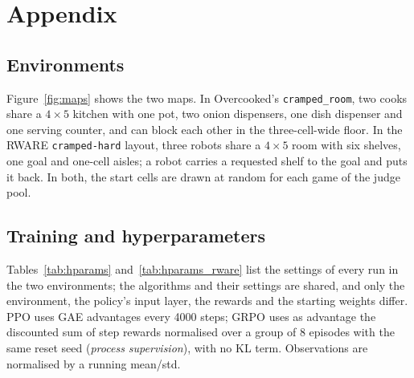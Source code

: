 \documentclass[letterpaper]{article} %
\newif\iffigs \figstrue
\newcommand{\figinput}[1]{\iffigs\else\fbox{\parbox{0.9\linewidth}{\centering\texttt{\detokenize{#1}} (figure skipped)}}\fi}
\begin{document}
\setcounter{secnumdepth}{2}
\renewcommand{\thesubsection}{\Alph{subsection}}
\section*{Appendix}
\setcounter{subsection}{0}
\subsection{Environments}
\label{app:env}
Figure~\ref{fig:maps} shows the two maps. In Overcooked's \texttt{cramped\_room}, two cooks share a $4\times5$ kitchen
with one pot, two onion dispensers, one dish dispenser and one serving counter, and can block each other in the
three-cell-wide floor. In the RWARE \texttt{cramped-hard} layout, three robots share a $4\times5$ room with six shelves,
one goal and one-cell aisles; a robot carries a requested shelf to the goal and puts it back. In both, the start
cells are drawn at random for each game of the judge pool.

\par\medskip\noindent\begin{minipage}{\textwidth}
\centering
\figinput{figures/fig_maps.tex}
\label{fig:maps}
\end{minipage}\par\medskip

\subsection{Training and hyperparameters}
\label{app:hparams}
Tables~\ref{tab:hparams} and~\ref{tab:hparams_rware} list the settings of every run in the two environments; the algorithms and their settings are
shared, and only the environment, the policy's input layer, the rewards and the starting weights differ. PPO uses GAE
advantages every 4000 steps; GRPO uses as advantage the discounted sum of step rewards normalised over a group of 8
episodes with the same reset seed (\emph{process supervision}), with no KL term. Observations are normalised by a
running mean/std.
\end{document}
